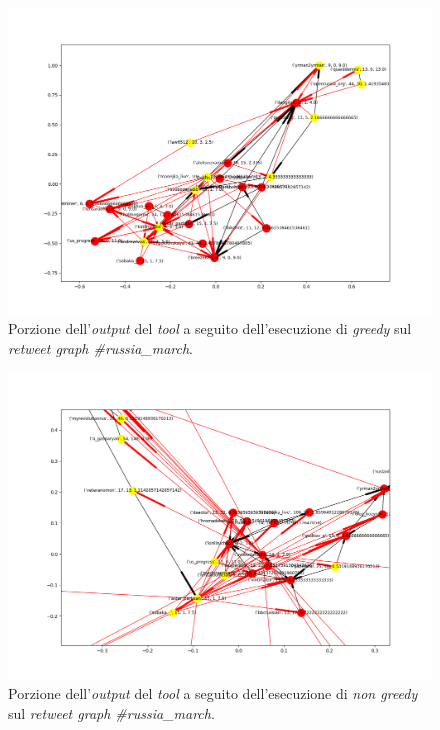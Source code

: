 \begin{figure}
\begin{center}
\includegraphics[scale=0.5]{images/russia_march_in_degree_greedy_probability_free.png}
\end{center}
\caption{Porzione dell'\textit{output} del \textit{tool} a seguito dell'esecuzione di \textit{greedy} sul \textit{retweet graph \#russia\_march}.}
\label{fig:russiagreedy}
\end{figure}

\begin{figure}
\begin{center}
\includegraphics[scale=0.5]{images/russia_march_in_degree_probability_free.png}
\end{center}
\caption{Porzione dell'\textit{output} del \textit{tool} a seguito dell'esecuzione di \textit{non greedy} sul \textit{retweet graph \#russia\_march}.}
\label{fig:russianotgreedy}
\end{figure}



